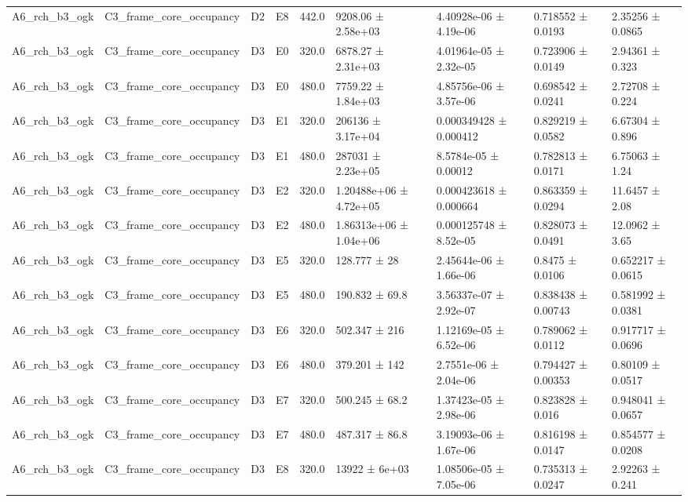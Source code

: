 \begin{table}
\begin{tabular}{lllllllll}
A6\_rch\_b3\_ogk & C3\_frame\_core\_occupancy & D2 & E8 & 442.0 & 9208.06 ± 2.58e+03 & 4.40928e-06 ± 4.19e-06 & 0.718552 ± 0.0193 & 2.35256 ± 0.0865 \\
A6\_rch\_b3\_ogk & C3\_frame\_core\_occupancy & D3 & E0 & 320.0 & 6878.27 ± 2.31e+03 & 4.01964e-05 ± 2.32e-05 & 0.723906 ± 0.0149 & 2.94361 ± 0.323 \\
A6\_rch\_b3\_ogk & C3\_frame\_core\_occupancy & D3 & E0 & 480.0 & 7759.22 ± 1.84e+03 & 4.85756e-06 ± 3.57e-06 & 0.698542 ± 0.0241 & 2.72708 ± 0.224 \\
A6\_rch\_b3\_ogk & C3\_frame\_core\_occupancy & D3 & E1 & 320.0 & 206136 ± 3.17e+04 & 0.000349428 ± 0.000412 & 0.829219 ± 0.0582 & 6.67304 ± 0.896 \\
A6\_rch\_b3\_ogk & C3\_frame\_core\_occupancy & D3 & E1 & 480.0 & 287031 ± 2.23e+05 & 8.5784e-05 ± 0.00012 & 0.782813 ± 0.0171 & 6.75063 ± 1.24 \\
A6\_rch\_b3\_ogk & C3\_frame\_core\_occupancy & D3 & E2 & 320.0 & 1.20488e+06 ± 4.72e+05 & 0.000423618 ± 0.000664 & 0.863359 ± 0.0294 & 11.6457 ± 2.08 \\
A6\_rch\_b3\_ogk & C3\_frame\_core\_occupancy & D3 & E2 & 480.0 & 1.86313e+06 ± 1.04e+06 & 0.000125748 ± 8.52e-05 & 0.828073 ± 0.0491 & 12.0962 ± 3.65 \\
A6\_rch\_b3\_ogk & C3\_frame\_core\_occupancy & D3 & E5 & 320.0 & 128.777 ± 28 & 2.45644e-06 ± 1.66e-06 & 0.8475 ± 0.0106 & 0.652217 ± 0.0615 \\
A6\_rch\_b3\_ogk & C3\_frame\_core\_occupancy & D3 & E5 & 480.0 & 190.832 ± 69.8 & 3.56337e-07 ± 2.92e-07 & 0.838438 ± 0.00743 & 0.581992 ± 0.0381 \\
A6\_rch\_b3\_ogk & C3\_frame\_core\_occupancy & D3 & E6 & 320.0 & 502.347 ± 216 & 1.12169e-05 ± 6.52e-06 & 0.789062 ± 0.0112 & 0.917717 ± 0.0696 \\
A6\_rch\_b3\_ogk & C3\_frame\_core\_occupancy & D3 & E6 & 480.0 & 379.201 ± 142 & 2.7551e-06 ± 2.04e-06 & 0.794427 ± 0.00353 & 0.80109 ± 0.0517 \\
A6\_rch\_b3\_ogk & C3\_frame\_core\_occupancy & D3 & E7 & 320.0 & 500.245 ± 68.2 & 1.37423e-05 ± 2.98e-06 & 0.823828 ± 0.016 & 0.948041 ± 0.0657 \\
A6\_rch\_b3\_ogk & C3\_frame\_core\_occupancy & D3 & E7 & 480.0 & 487.317 ± 86.8 & 3.19093e-06 ± 1.67e-06 & 0.816198 ± 0.0147 & 0.854577 ± 0.0208 \\
A6\_rch\_b3\_ogk & C3\_frame\_core\_occupancy & D3 & E8 & 320.0 & 13922 ± 6e+03 & 1.08506e-05 ± 7.05e-06 & 0.735313 ± 0.0247 & 2.92263 ± 0.241 \\

\end{tabular}
\end{table}
